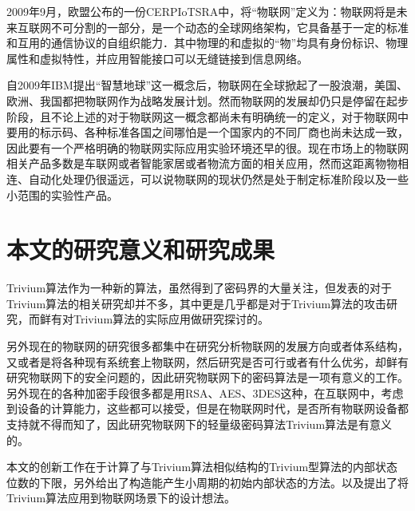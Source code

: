 2009年9月，欧盟公布的一份CERPIoTSRA中，将“物联网”定义为：物联网将是未来互联网不可分割的一部分，是一个动态的全球网络架构，它具备基于一定的标准和互用的通信协议的自组织能力．其中物理的和虚拟的“物”均具有身份标识、物理属性和虚拟特性，并应用智能接口可以无缝链接到信息网络\parencite{宁焕生2010全球物联网发展及中国物联网建设若干思考}。

自2009年IBM提出“智慧地球”这一概念后，物联网在全球掀起了一股浪潮，美国、欧洲、我国都把物联网作为战略发展计划。然而物联网的发展却仍只是停留在起步阶段，且不论上述的对于物联网这一概念都尚未有明确统一的定义，对于物联网中要用的标示码、各种标准各国之间哪怕是一个国家内的不同厂商也尚未达成一致，因此要有一个严格明确的物联网实际应用实验环境还早的很。现在市场上的物联网相关产品多数是车联网或者智能家居或者物流方面的相关应用，然而这距离物物相连、自动化处理仍很遥远，可以说物联网的现状仍然是处于制定标准阶段以及一些小范围的实验性产品。

\section{本文的研究意义和研究成果}

Trivium算法作为一种新的算法，虽然得到了密码界的大量关注，但发表的对于Trivium算法的相关研究却并不多，其中更是几乎都是对于Trivium算法的攻击研究，而鲜有对Trivium算法的实际应用做研究探讨的。

另外现在的物联网的研究很多都集中在研究分析物联网的发展方向或者体系结构，又或者是将各种现有系统套上物联网，然后研究是否可行或者有什么优劣，却鲜有研究物联网下的安全问题的，因此研究物联网下的密码算法是一项有意义的工作。另外现在的各种加密手段很多都是用RSA、AES、3DES这种，在互联网中，考虑到设备的计算能力，这些都可以接受，但是在物联网时代，是否所有物联网设备都支持就不得而知了，因此研究物联网下的轻量级密码算法Trivium算法是有意义的。

本文的创新工作在于计算了与Trivium算法相似结构的Trivium型算法的内部状态位数的下限，另外给出了构造能产生小周期的初始内部状态的方法。以及提出了将Trivium算法应用到物联网场景下的设计想法。

